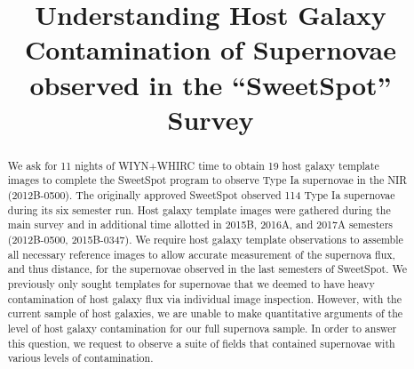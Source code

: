 \documentclass[11pt]{article}
\begin{document}
%
%

\title{Understanding Host Galaxy Contamination of Supernovae observed in the ``SweetSpot'' Survey}



%


\begin{abstract}

We ask for 11 nights of WIYN+WHIRC time to obtain 19 host galaxy template images
to complete the SweetSpot program to observe Type Ia supernovae in the NIR (2012B-0500).
The originally approved SweetSpot observed 114 Type Ia supernovae during its six semester run. 
Host galaxy template images were gathered during the main survey and in additional time allotted in 2015B, 2016A, and 2017A semesters (2012B-0500, 2015B-0347). 
We require host galaxy template observations to assemble all necessary reference images to allow accurate measurement of the supernova flux, and thus distance, for the supernovae observed in the last semesters of SweetSpot.
We previously only sought templates for supernovae that we deemed to have heavy contamination of host galaxy flux via individual image inspection.
However, with the current sample of host galaxies, we are unable to make quantitative arguments of the level of host galaxy contamination for our full supernova sample.
In order to answer this question, we request to observe a suite of fields that contained supernovae with various levels of contamination.   


\end{abstract}
\end{document}
